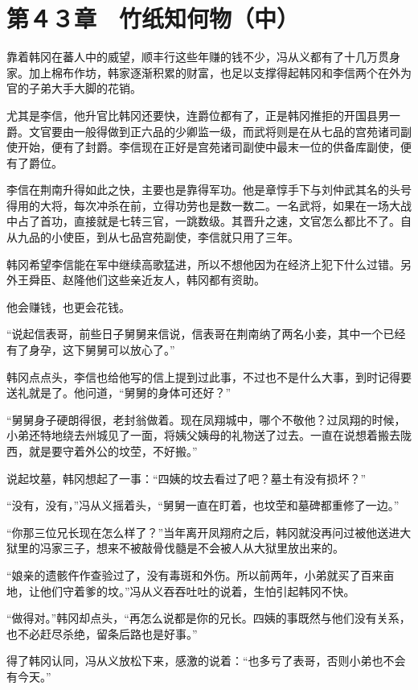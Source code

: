 \section{第４３章　竹纸知何物（中）}

靠着韩冈在蕃人中的威望，顺丰行这些年赚的钱不少，冯从义都有了十几万贯身家。加上棉布作坊，韩家逐渐积累的财富，也足以支撑得起韩冈和李信两个在外为官的子弟大手大脚的花销。

尤其是李信，他升官比韩冈还要快，连爵位都有了，正是韩冈推拒的开国县男一爵。文官要由一般得做到正六品的少卿监一级，而武将则是在从七品的宫苑诸司副使开始，便有了封爵。李信现在正好是宫苑诸司副使中最末一位的供备库副使，便有了爵位。

李信在荆南升得如此之快，主要也是靠得军功。他是章惇手下与刘仲武其名的头号得用的大将，每次冲杀在前，立得功劳也是数一数二。一名武将，如果在一场大战中占了首功，直接就是七转三官，一跳数级。其晋升之速，文官怎么都比不了。自从九品的小使臣，到从七品宫苑副使，李信就只用了三年。

韩冈希望李信能在军中继续高歌猛进，所以不想他因为在经济上犯下什么过错。另外王舜臣、赵隆他们这些亲近友人，韩冈都有资助。

他会赚钱，也更会花钱。

“说起信表哥，前些日子舅舅来信说，信表哥在荆南纳了两名小妾，其中一个已经有了身孕，这下舅舅可以放心了。”

韩冈点点头，李信也给他写的信上提到过此事，不过也不是什么大事，到时记得要送礼就是了。他问道，“舅舅的身体可还好？”

“舅舅身子硬朗得很，老封翁做着。现在凤翔城中，哪个不敬他？过凤翔的时候，小弟还特地绕去州城见了一面，将姨父姨母的礼物送了过去。一直在说想着搬去陇西，就是要守着外公的坟茔，不好搬。”

说起坟墓，韩冈想起了一事：“四姨的坟去看过了吧？墓土有没有损坏？”

“没有，没有，”冯从义摇着头，“舅舅一直在盯着，也坟茔和墓碑都重修了一边。”

“你那三位兄长现在怎么样了？”当年离开凤翔府之后，韩冈就没再问过被他送进大狱里的冯家三子，想来不被敲骨伐髓是不会被人从大狱里放出来的。

“娘亲的遗骸仵作查验过了，没有毒斑和外伤。所以前两年，小弟就买了百来亩地，让他们守着爹的坟。”冯从义吞吞吐吐的说着，生怕引起韩冈不快。

“做得对。”韩冈却点头，“再怎么说都是你的兄长。四姨的事既然与他们没有关系，也不必赶尽杀绝，留条后路也是好事。”

得了韩冈认同，冯从义放松下来，感激的说着：“也多亏了表哥，否则小弟也不会有今天。”

